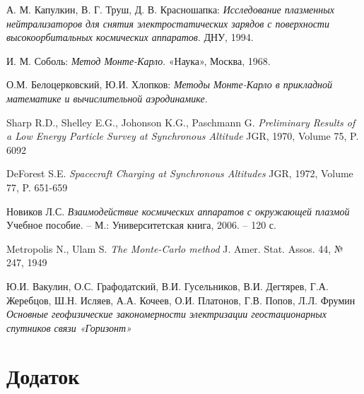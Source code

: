 \documentclass[a4paper,12pt]{article}
\begin{document}
\begin{thebibliography}{9}

  А. М. Капулкин, В. Г. Труш, Д. В. Красношапка:
  \emph{Исследование плазменных нейтрализаторов для снятия электростатических зарядов с поверхности высокоорбитальных космических аппаратов}.
  ДНУ, 1994.

  И. М. Соболь:
  \emph{Метод Монте-Карло}.
  «Наука», Москва, 1968.

  О.М. Белоцерковский, Ю.И. Хлопков:
  \emph{Методы Монте-Карло в прикладной математике и вычислительной аэродинамике}.

  Sharp R.D., Shelley E.G., Johonson K.G., Paschmann G.
  \emph{Preliminary Results of a Low Energy Particle Survey at Synchronous Altitude}
  JGR, 1970, Volume 75, P. 6092

  DeForest S.E.
  \emph{Spacecraft Charging at Synchronous Altitudes}
  JGR, 1972, Volume 77, P. 651-659

  Новиков Л.С.
  \emph{Взаимодействие космических аппаратов с окружающей плазмой}
  Учебное пособие. -- М.: Университетская книга, 2006. -- 120 с.
  
  Metropolis N., Ulam S.
  \emph{The Monte-Carlo method}
  J. Amer. Stat. Assos. 44,  № 247, 1949
  
  Ю.И. Вакулин, О.С. Графодатский, В.И. Гусельников, В.И. Дегтярев, Г.А. Жеребцов, Ш.Н. Исляев, А.А. Кочеев, О.И. Платонов, Г.В. Попов, Л.Л. Фрумин
  \emph{Основные геофизические закономерности электризации геостационарных спутников связи «Горизонт»}  

\end{thebibliography}

\newpage
{}
\section*{Додаток}
\end{document}
